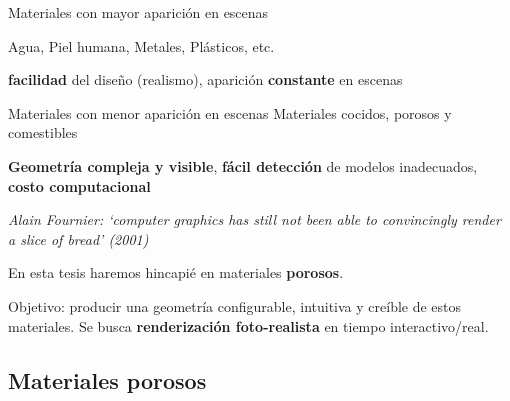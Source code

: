 \documentclass[spanish,unknownkeysallowed,10pt]{beamer}
\begin{document}
\begin{frame}{}

\begin{block}{Materiales con mayor aparición en escenas}

Agua, Piel humana, Metales, Plásticos, etc. 

\textbf{facilidad} del diseño (realismo), aparición \textbf{constante} en escenas

\end{block}

\begin{block}{Materiales con menor aparición en escenas}
Materiales cocidos, porosos y comestibles

\textbf{Geometría compleja y visible}, \textbf{fácil detección} de modelos inadecuados, \textbf{costo computacional}
\end{block}

{\it Alain Fournier: `computer graphics has still not been
able to convincingly render a slice of bread' (2001)}

\begin{block}{}
En esta tesis haremos hincapié en materiales \textbf{porosos}.

Objetivo: producir una geometría configurable, intuitiva y creíble de estos materiales. Se busca \textbf{renderización foto-realista} en tiempo interactivo/real.

\end{block}

\end{frame}



\subsection{Materiales porosos}
\end{document}
